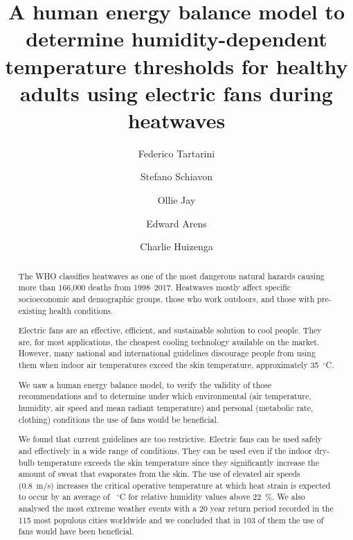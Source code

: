 
\begin{frontmatter}

\title{A human energy balance model to determine humidity-dependent temperature thresholds for healthy adults using electric fans during heatwaves}


\author[sinBerBest]{Federico Tartarini}
\author[CBE]{Stefano Schiavon}
\author[USYD]{Ollie Jay}
\author[CBE]{Edward Arens}
\author[CBE]{Charlie Huizenga}

\address[sinBerBest]{SinBerBEST, Berkeley Education Alliance for Research in Singapore, Singapore}
\address[CBE]{Center for the Built Environment, University of California, Berkeley, USA}
 \address[USYD]{Sydney School of Health Sciences, Faculty of Medicine and Health, The University of Sydney, Sydney, Australia}

\begin{abstract}
    The WHO classifies heatwaves as one of the most dangerous natural hazards causing more than 166,000 deaths from 1998--2017.
    Heatwaves mostly affect specific socioeconomic and demographic groups, those who work outdoors, and those with pre-existing health conditions.
    
    Electric fans are an effective, efficient, and sustainable solution to cool people.
    They are, for most applications, the cheapest cooling technology available on the market.
    However, many national and international guidelines discourage people from using them when indoor air temperatures exceed the skin temperature, approximately 35~$^{\circ}$C\@.
    
    We uaw a human energy balance model, to verify the validity of those recommendations and to determine under which environmental (air temperature, humidity, air speed and mean radiant temperature) and personal (metabolic rate, clothing) conditions the use of fans would be beneficial.
    
    We found that current guidelines are too restrictive.
    Electric fans can be used safely and effectively in a wide range of conditions.
    They can be used even if the indoor dry-bulb temperature exceeds the skin temperature since they significantly increase the amount of sweat that evaporates from the skin.
    The use of elevated air speeds (0.8~m/s) increases the critical operative temperature at which heat strain is expected to occur by an average of ~$^{\circ}$C for relative humidity values above 22~\%\@.
    We also analysed the most extreme weather events with a 20 year return period recorded in the 115 most populous cities worldwide and we concluded that in 103 of them the use of fans would have been beneficial.
    

\end{abstract}
\end{frontmatter}
